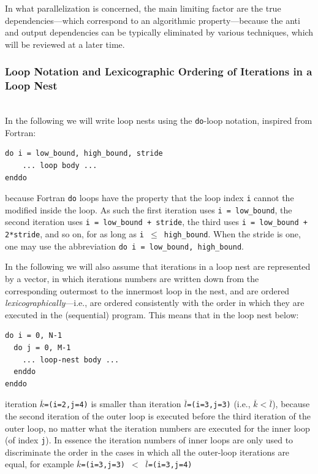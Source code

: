 \documentclass[acmsmall,review]{acmart}\settopmatter{printfolios=true,printccs=false,printacmref=false}
\begin{document}
In what parallelization is concerned, the main limiting factor 
are the true dependencies---which correspond to an algorithmic 
property---because the anti and output dependencies can be 
typically eliminated by various techniques, which will be
reviewed at a later time. 

\subsubsection{Loop Notation and Lexicographic Ordering of Iterations in a Loop Nest}
$\mbox{ }$\\

In the following we will write loop nests using the \lstinline{do}-loop
notation, inspired from Fortran:
\begin{lstlisting}[mathescape=true]
do i = low_bound, high_bound, stride
    ... loop body ...
enddo
\end{lstlisting}\vspace{-2ex}
because Fortran \lstinline{do} loops have the property that 
the loop index {\tt i} cannot the modified inside the loop. As
such the first iteration uses {\tt i = low\_bound}, the second
iteration uses {\tt i = low\_bound + stride}, the third uses
{\tt i = low\_bound + 2*stride}, and so on, for as long as 
{\tt i $\leq$ high\_bound}. When the stride is one, one may
use the abbreviation \lstinline{do i = low_bound, high_bound}.

In the following we will also assume that iterations in a loop 
nest are represented by a vector, in which iterations numbers 
are written down from the corresponding outermost to the innermost
loop in the nest, and are ordered \emph{lexicographically}---i.e., 
are ordered consistently with the order in which they are executed 
in the (sequential) program. This means that in the loop nest below:
\begin{lstlisting}[mathescape=true]
do i = 0, N-1
  do j = 0, M-1
    ... loop-nest body ...
  enddo
enddo
\end{lstlisting}\vspace{-2ex}
iteration {\tt$\overline{k}$=(i=2,j=4)} is smaller than iteration 
{\tt$\overline{l}$=(i=3,j=3)} (i.e., $\overline{k} < \overline{l}$),
because the second iteration of the outer loop is executed before
the third iteration of the outer loop, no matter what the iteration
numbers are executed for the inner loop (of index {\tt j}). 
In essence the iteration numbers of inner loops are only used to 
discriminate the order in the cases in which all the outer-loop
iterations are equal, for example 
{\tt$\overline{k}$=(i=3,j=3) $<$ $\overline{l}$=(i=3,j=4)}
\end{document}
